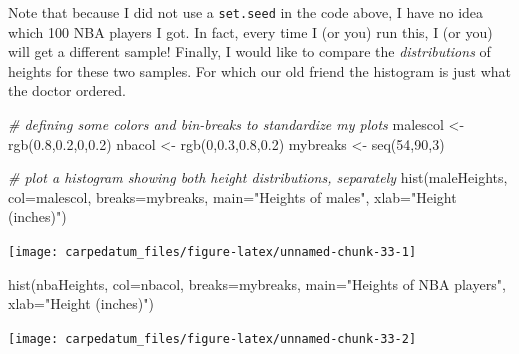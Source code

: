 \documentclass[
  openany]{book}
\newenvironment{Shaded}{\begin{snugshade}}{\end{snugshade}}
\newcommand{\AttributeTok}[1]{\textcolor[rgb]{0.77,0.63,0.00}{#1}}
\newcommand{\CommentTok}[1]{\textcolor[rgb]{0.56,0.35,0.01}{\textit{#1}}}
\newcommand{\DecValTok}[1]{\textcolor[rgb]{0.00,0.00,0.81}{#1}}
\newcommand{\FloatTok}[1]{\textcolor[rgb]{0.00,0.00,0.81}{#1}}
\newcommand{\FunctionTok}[1]{\textcolor[rgb]{0.00,0.00,0.00}{#1}}
\newcommand{\NormalTok}[1]{#1}
\newcommand{\OtherTok}[1]{\textcolor[rgb]{0.56,0.35,0.01}{#1}}
\newcommand{\StringTok}[1]{\textcolor[rgb]{0.31,0.60,0.02}{#1}}
\begin{document}
Note that because I did not use a \texttt{set.seed} in the code above, I have no idea which 100 NBA players I got. In fact, every time I (or you) run this, I (or you) will get a different sample! Finally, I would like to compare the \emph{distributions} of heights for these two samples. For which our old friend the histogram is just what the doctor ordered.

\begin{Shaded}
\begin{Highlighting}[]
\CommentTok{\# defining some colors and bin{-}breaks to standardize my plots}
\NormalTok{malescol }\OtherTok{\textless{}{-}} \FunctionTok{rgb}\NormalTok{(}\FloatTok{0.8}\NormalTok{,}\FloatTok{0.2}\NormalTok{,}\DecValTok{0}\NormalTok{,}\FloatTok{0.2}\NormalTok{)}
\NormalTok{nbacol }\OtherTok{\textless{}{-}} \FunctionTok{rgb}\NormalTok{(}\DecValTok{0}\NormalTok{,}\FloatTok{0.3}\NormalTok{,}\FloatTok{0.8}\NormalTok{,}\FloatTok{0.2}\NormalTok{)}
\NormalTok{mybreaks }\OtherTok{\textless{}{-}} \FunctionTok{seq}\NormalTok{(}\DecValTok{54}\NormalTok{,}\DecValTok{90}\NormalTok{,}\DecValTok{3}\NormalTok{)}

\CommentTok{\# plot a histogram showing both height distributions, separately}
\FunctionTok{hist}\NormalTok{(maleHeights, }\AttributeTok{col=}\NormalTok{malescol, }\AttributeTok{breaks=}\NormalTok{mybreaks, }
          \AttributeTok{main=}\StringTok{"Heights of males"}\NormalTok{, }\AttributeTok{xlab=}\StringTok{"Height (inches)"}\NormalTok{)}
\end{Highlighting}
\end{Shaded}

\begin{center}\texttt{[image: carpedatum\_files/figure-latex/unnamed-chunk-33-1]} \end{center}

\begin{Shaded}
\begin{Highlighting}[]
\FunctionTok{hist}\NormalTok{(nbaHeights, }\AttributeTok{col=}\NormalTok{nbacol, }\AttributeTok{breaks=}\NormalTok{mybreaks, }
     \AttributeTok{main=}\StringTok{"Heights of NBA players"}\NormalTok{, }\AttributeTok{xlab=}\StringTok{"Height (inches)"}\NormalTok{)}
\end{Highlighting}
\end{Shaded}

\begin{center}\texttt{[image: carpedatum\_files/figure-latex/unnamed-chunk-33-2]} \end{center}
\end{document}
